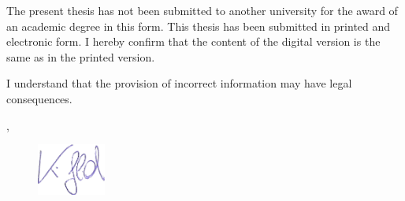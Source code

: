 \begin{titlepage}
{The present thesis has not been submitted to another university 
for the award of an academic degree in this form. This thesis 
has been submitted in printed and electronic form. I hereby 
confirm that the content of the digital version is the same 
as in the printed version.

I understand that the provision of incorrect information may 
have legal consequences.


}%


\vspace{1,5cm}
\yourPlace, \submissionDate

\begin{figure}[h]
  \includegraphics[keepaspectratio,width=0.2\textwidth, right]{images/signature}
\end{figure}
\flushright

\yourName


\end{titlepage}





